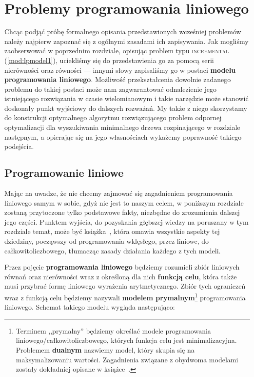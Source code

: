 \chapter{Problemy programowania liniowego}
\thispagestyle{chapterBeginStyle}
\label{ch:linearprog}

Chcąc podjąć próbę formalnego opisania przedstawionych wcześniej problemów należy najpierw zapoznać się z ogólnymi zasadami ich zapisywania. Jak mogliśmy zaobserwować w poprzednim rozdziale, opisując problem typu \textsc{incremental} (\ref{mod:lpmodel1}), uciekliśmy się do przedstawienia go za pomocą serii nierówności oraz równości --- innymi słowy zapisaliśmy go w postaci \textbf{modelu programowania liniowego}. Możliwość przekształcenia dowolnie zadanego problemu do takiej postaci może nam zagwarantować odnalezienie jego istniejącego rozwiązania w czasie wielomianowym i takie narzędzie może stanowić doskonały punkt wyjściowy do dalszych rozważań. My także z niego skorzystamy do konstrukcji optymalnego algorytmu rozwiązującego problem odpornej optymalizacji dla wyszukiwania minimalnego drzewa rozpinającego w rozdziale następnym, a opierając się na jego własnościach wykażemy poprawność takiego podejścia.

\section{Programowanie liniowe}

Mając na uwadze, że nie chcemy zajmować się zagadnieniem programowania liniowego samym w sobie, gdyż nie jest to naszym celem, w poniższym rozdziale zostaną przytoczone tylko podstawowe fakty, niezbędne do zrozumienia dalszej jego części. Punktem wyjścia, do pozyskania głębszej wiedzy na poruszany w tym rozdziale temat, może być książka~\cite{Papadimitriou:1982:COA:31027}, która omawia wszystkie aspekty tej dziedziny, począwszy od programowania wklęsłego, przez liniowe, do całkowitoliczbowego, tłumacząc zasady działania każdego z tych modeli.

Przez pojęcie \textbf{programowania liniowego} będziemy rozumieli zbiór liniowych równań oraz nierówności wraz z określoną dla nich \textbf{funkcją celu}, która także musi przybrać formę liniowego wyrażenia arytmetycznego. Zbiór tych ograniczeń wraz z funkcją celu będziemy nazywali \textbf{modelem prymalnym}\footnote{Terminem ,,prymalny'' będziemy określać modele programowania liniowego/całkowitoliczbowego, których funkcja celu jest minimalizacyjna. Problemem \textbf{dualnym} nazwiemy model, który skupia się na maksymalizowaniu wartości. Zagadnienia związane z obydwoma modelami zostały dokładniej opisane w książce~\cite[$67$--$73$]{Papadimitriou:1982:COA:31027}.} programowania liniowego. Schemat takiego modelu wygląda następująco:

